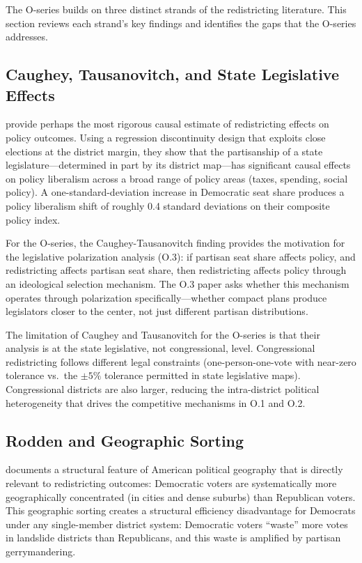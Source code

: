 \label{sec:literature}

The O-series builds on three distinct strands of the redistricting literature.
This section reviews each strand's key findings and identifies the gaps that the
O-series addresses.

\subsection{Caughey, Tausanovitch, and State Legislative Effects}

\citet{caugheyTausanovitch2017} provide perhaps the most rigorous causal estimate
of redistricting effects on policy outcomes. Using a regression discontinuity design
that exploits close elections at the district margin, they show that the partisanship
of a state legislature---determined in part by its district map---has significant causal
effects on policy liberalism across a broad range of policy areas (taxes, spending,
social policy). A one-standard-deviation increase in Democratic seat share produces
a policy liberalism shift of roughly 0.4 standard deviations on their composite
policy index.

For the O-series, the Caughey-Tausanovitch finding provides the motivation for
the legislative polarization analysis (O.3): if partisan seat share affects policy,
and redistricting affects partisan seat share, then redistricting affects policy
through an ideological selection mechanism. The O.3 paper asks whether this mechanism
operates through polarization specifically---whether compact plans produce legislators
closer to the center, not just different partisan distributions.

The limitation of Caughey and Tausanovitch for the O-series is that their analysis
is at the state legislative, not congressional, level. Congressional redistricting
follows different legal constraints (one-person-one-vote with near-zero tolerance
vs.\ the $\pm5\%$ tolerance permitted in state legislative maps). Congressional
districts are also larger, reducing the intra-district political heterogeneity
that drives the competitive mechanisms in O.1 and O.2.

\subsection{Rodden and Geographic Sorting}

\citet{rodden2019} documents a structural feature of American political geography
that is directly relevant to redistricting outcomes: Democratic voters are systematically
more geographically concentrated (in cities and dense suburbs) than Republican voters.
This geographic sorting creates a structural efficiency disadvantage for Democrats under
any single-member district system: Democratic voters ``waste'' more votes in landslide
districts than Republicans, and this waste is amplified by partisan gerrymandering.

